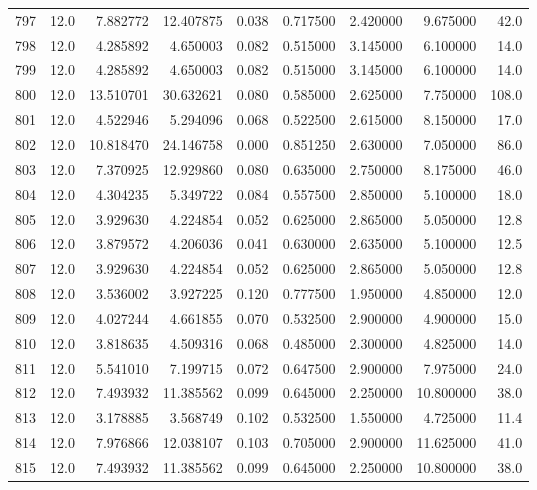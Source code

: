 \begin{tabular}{lrrrrrrrr}
797  &   12.0 &   7.882772 &  12.407875 &  0.038 &  0.717500 &  2.420000 &   9.675000 &   42.0 \\
798  &   12.0 &   4.285892 &   4.650003 &  0.082 &  0.515000 &  3.145000 &   6.100000 &   14.0 \\
799  &   12.0 &   4.285892 &   4.650003 &  0.082 &  0.515000 &  3.145000 &   6.100000 &   14.0 \\
800  &   12.0 &  13.510701 &  30.632621 &  0.080 &  0.585000 &  2.625000 &   7.750000 &  108.0 \\
801  &   12.0 &   4.522946 &   5.294096 &  0.068 &  0.522500 &  2.615000 &   8.150000 &   17.0 \\
802  &   12.0 &  10.818470 &  24.146758 &  0.000 &  0.851250 &  2.630000 &   7.050000 &   86.0 \\
803  &   12.0 &   7.370925 &  12.929860 &  0.080 &  0.635000 &  2.750000 &   8.175000 &   46.0 \\
804  &   12.0 &   4.304235 &   5.349722 &  0.084 &  0.557500 &  2.850000 &   5.100000 &   18.0 \\
805  &   12.0 &   3.929630 &   4.224854 &  0.052 &  0.625000 &  2.865000 &   5.050000 &   12.8 \\
806  &   12.0 &   3.879572 &   4.206036 &  0.041 &  0.630000 &  2.635000 &   5.100000 &   12.5 \\
807  &   12.0 &   3.929630 &   4.224854 &  0.052 &  0.625000 &  2.865000 &   5.050000 &   12.8 \\
808  &   12.0 &   3.536002 &   3.927225 &  0.120 &  0.777500 &  1.950000 &   4.850000 &   12.0 \\
809  &   12.0 &   4.027244 &   4.661855 &  0.070 &  0.532500 &  2.900000 &   4.900000 &   15.0 \\
810  &   12.0 &   3.818635 &   4.509316 &  0.068 &  0.485000 &  2.300000 &   4.825000 &   14.0 \\
811  &   12.0 &   5.541010 &   7.199715 &  0.072 &  0.647500 &  2.900000 &   7.975000 &   24.0 \\
812  &   12.0 &   7.493932 &  11.385562 &  0.099 &  0.645000 &  2.250000 &  10.800000 &   38.0 \\
813  &   12.0 &   3.178885 &   3.568749 &  0.102 &  0.532500 &  1.550000 &   4.725000 &   11.4 \\
814  &   12.0 &   7.976866 &  12.038107 &  0.103 &  0.705000 &  2.900000 &  11.625000 &   41.0 \\
815  &   12.0 &   7.493932 &  11.385562 &  0.099 &  0.645000 &  2.250000 &  10.800000 &   38.0 \\

\end{tabular}
